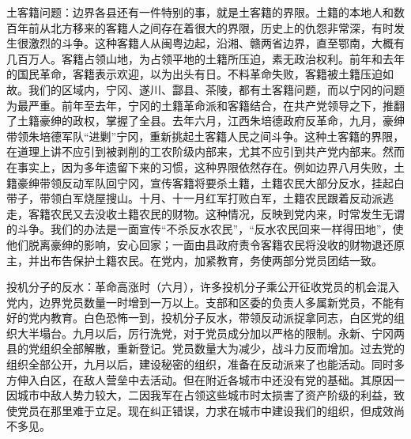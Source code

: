 土客籍问题：边界各县还有一件特别的事，就是土客籍的界限。土籍的本地人和数百年前从北方移来的客籍人之间存在着很大的界限，历史上的仇怨非常深，有时发生很激烈的斗争。这种客籍人从闽粤边起，沿湘、赣两省边界，直至鄂南，大概有几百万人。客籍占领山地，为占领平地的土籍所压迫，素无政治权利。前年和去年的国民革命，客籍表示欢迎，以为出头有日。不料革命失败，客籍被土籍压迫如故。我们的区域内，宁冈、遂川、酃县、茶陵，都有土客籍问题，而以宁冈的问题为最严重。前年至去年，宁冈的土籍革命派和客籍结合，在共产党领导之下，推翻了土籍豪绅的政权，掌握了全县。去年六月，江西朱培德政府反革命，九月，豪绅带领朱培德军队“进剿”宁冈，重新挑起土客籍人民之间斗争。这种土客籍的界限，在道理上讲不应引到被剥削的工农阶级内部来，尤其不应引到共产党内部来。然而在事实上，因为多年遗留下来的习惯，这种界限依然存在。例如边界八月失败，土籍豪绅带领反动军队回宁冈，宣传客籍将要杀土籍，土籍农民大部分反水，挂起白带子，带领白军烧屋搜山。十月、十一月红军打败白军，土籍农民跟着反动派逃走，客籍农民又去没收土籍农民的财物。这种情况，反映到党内来，时常发生无谓的斗争。我们的办法是一面宣传“不杀反水农民”，“反水农民回来一样得田地”，使他们脱离豪绅的影响，安心回家；一面由县政府责令客籍农民将没收的财物退还原主，并出布告保护土籍农民。在党内，加紧教育，务使两部分党员团结一致。

投机分子的反水：革命高涨时（六月），许多投机分子乘公开征收党员的机会混入党内，边界党员数量一时增到一万以上。支部和区委的负责人多属新党员，不能有好的党内教育。白色恐怖一到，投机分子反水，带领反动派捉拿同志，白区党的组织大半塌台。九月以后，厉行洗党，对于党员成分加以严格的限制。永新、宁冈两县的党组织全部解散，重新登记。党员数量大为减少，战斗力反而增加。过去党的组织全部公开，九月以后，建设秘密的组织，准备在反动派来了也能活动。同时多方伸入白区，在敌人营垒中去活动。但在附近各城市中还没有党的基础。其原因一因城市中敌人势力较大，二因我军在占领这些城市时太损害了资产阶级的利益，致使党员在那里难于立足。现在纠正错误，力求在城市中建设我们的组织，但成效尚不多见。

